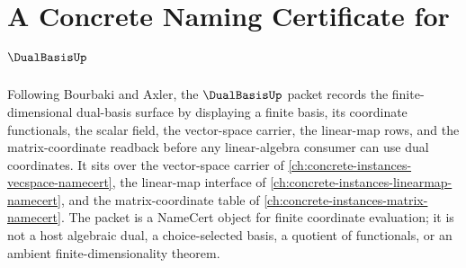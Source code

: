 \chapter{A Concrete Naming Certificate for $\DualBasisUp$}
\label{ch:concrete-instances-dual-basis-namecert}

Following Bourbaki and Axler, the $\DualBasisUp$ packet records the finite-dimensional dual-basis surface by displaying a finite basis, its coordinate functionals, the scalar field, the vector-space carrier, the linear-map rows, and the matrix-coordinate readback before any linear-algebra consumer can use dual coordinates. It sits over the vector-space carrier of \autoref{ch:concrete-instances-vecspace-namecert}, the linear-map interface of \autoref{ch:concrete-instances-linearmap-namecert}, and the matrix-coordinate table of \autoref{ch:concrete-instances-matrix-namecert}. The packet is a NameCert object for finite coordinate evaluation; it is not a host algebraic dual, a choice-selected basis, a quotient of functionals, or an ambient finite-dimensionality theorem.

